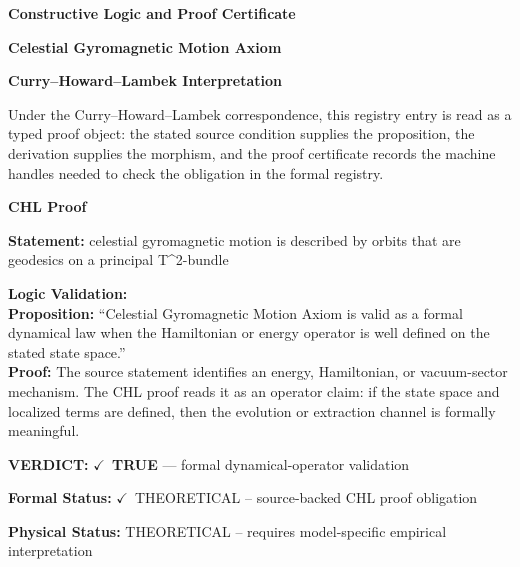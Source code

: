 \clearpage
\begingroup\tzpsupportsetup
\noindent\textbf{\fontsize{10.8pt}{12.8pt}\selectfont [ID 0136] Constructive Logic and Proof Certificate}\par
\noindent\textbf{\fontsize{10pt}{12pt}\selectfont Celestial Gyromagnetic Motion Axiom}\par
\vspace{0.45em}
\begingroup
\footnotesize
\setlength{\parskip}{0.22em}
\setlength{\parindent}{0pt}
\noindent\textbf{Curry--Howard--Lambek Interpretation}\par
Under the Curry--Howard--Lambek correspondence, this registry entry is read as a typed proof
object: the stated source condition supplies the proposition, the derivation supplies the
morphism, and the proof certificate records the machine handles needed to check the obligation
in the formal registry.

\vspace{0.45em}
\noindent\textbf{CHL Proof}\par
\textbf{Statement:} celestial gyromagnetic motion is described by orbits that are geodesics on a principal
T\textasciicircum{}2-bundle

\textbf{Logic Validation:}\\
\textbf{Proposition:} ``Celestial Gyromagnetic Motion Axiom is valid as a formal dynamical law when the
Hamiltonian or energy operator is well defined on the stated state space.''\\
\textbf{Proof:} The source statement identifies an energy, Hamiltonian, or vacuum-sector mechanism. The
CHL proof reads it as an operator claim: if the state space and localized terms are
defined, then the evolution or extraction channel is formally meaningful.

\textbf{VERDICT:} \ensuremath{\checkmark}\ \textbf{TRUE} --- formal dynamical-operator validation

\textbf{Formal Status:} \ensuremath{\checkmark}\ THEORETICAL -- source-backed CHL proof obligation

\textbf{Physical Status:} THEORETICAL -- requires model-specific empirical interpretation
\par\vspace{0.45em}
\par
\ifTZPDarkEdition
{}
\fi
\endgroup
\endgroup
